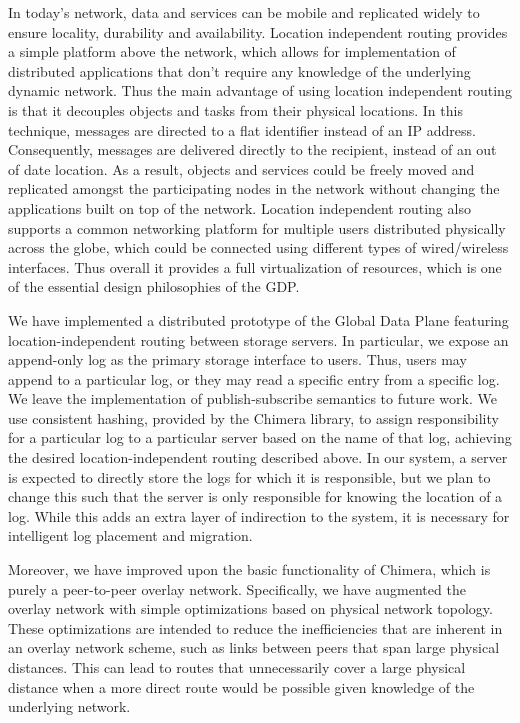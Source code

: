 In today’s network, data and services can be mobile and replicated widely to ensure locality, durability and availability. Location independent routing provides a simple platform above the network, which allows for implementation of distributed applications that don’t require any knowledge of the underlying dynamic network. Thus the main advantage of using location independent routing is that it decouples objects and tasks from their physical locations. In this technique, messages are directed to a flat identifier instead of an IP address. Consequently, messages are delivered directly to the recipient, instead of an out of date location. As a result, objects and services could be freely moved and replicated amongst the participating nodes in the network without changing the applications built on top of the network. \cite{oceanstore} Location independent routing also supports a common networking platform for multiple users distributed physically across the globe, which could be connected using different types of wired/wireless interfaces.  Thus overall it provides a full virtualization of resources, which is one of the essential design philosophies of the GDP.

We have implemented a distributed prototype of the Global Data Plane featuring location-independent routing between storage servers. In particular, we expose an append-only log as the primary storage interface to users. Thus, users may append to a particular log, or they may read a specific entry from a specific log. We leave the implementation of publish-subscribe semantics to future work. We use consistent hashing, provided by the Chimera\cite{chimera} library, to assign responsibility for a particular log to a particular server based on the name of that log, achieving the desired location-independent routing described above. In our system, a server is expected to directly store the logs for which it is responsible, but we plan to change this such that the server is only responsible for knowing the location of a log. While this adds an extra layer of indirection to the system, it is necessary for intelligent log placement and migration.

Moreover, we have improved upon the basic functionality of Chimera, which is purely a peer-to-peer overlay network. Specifically, we have augmented the overlay network with simple optimizations based on physical network topology. These optimizations are intended to reduce the inefficiencies that are inherent in an overlay network scheme, such as links between peers that span  large physical distances. This can lead to routes that unnecessarily cover a large physical distance when a more direct route would be possible given knowledge of the underlying network.

